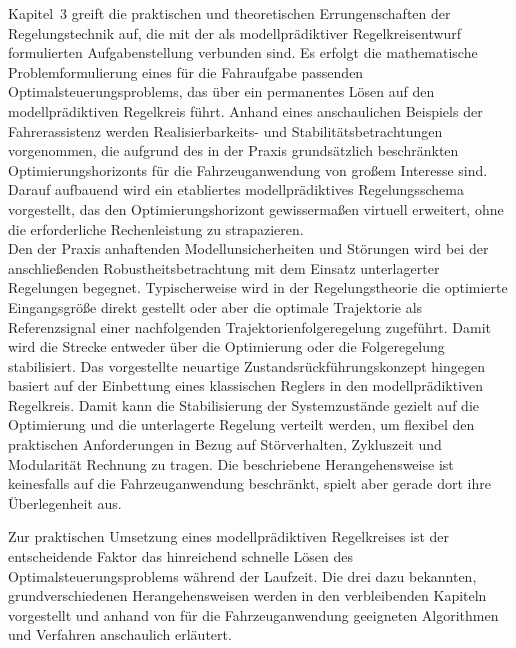 Kapitel~3 greift die praktischen und theoretischen Errungenschaften der Regelungstechnik auf, die mit der als modellprädiktiver Regelkreisentwurf formulierten Aufgabenstellung verbunden sind. Es erfolgt die mathematische Problemformulierung eines für die Fahraufgabe passenden Optimalsteuerungsproblems, das über ein permanentes Lösen auf den modellprädiktiven Regelkreis führt. 
Anhand eines anschaulichen Beispiels der Fahrerassistenz werden Realisierbarkeits- und Stabilitätsbetrachtungen vorgenommen, die aufgrund des in der Praxis grundsätzlich beschränkten Optimierungshorizonts für die Fahrzeuganwendung von großem Interesse sind.  Darauf aufbauend wird ein etabliertes modellprädiktives Regelungsschema vorgestellt, das den Optimierungshorizont gewissermaßen virtuell erweitert, ohne die erforderliche Rechenleistung zu strapazieren. \\
Den der Praxis anhaftenden Modellunsicherheiten und Störungen wird bei der anschließenden Robustheitsbetrachtung mit dem Einsatz unterlagerter Regelungen begegnet. Typischerweise wird in der Regelungstheorie die optimierte Eingangsgröße direkt gestellt oder aber die optimale Trajektorie als Referenzsignal einer nachfolgenden Trajektorienfolgeregelung zugeführt. Damit wird die Strecke entweder über die Optimierung oder die Folgeregelung stabilisiert. Das vorgestellte neuartige Zustandsrückführungskonzept hingegen basiert auf der Einbettung eines klassischen Reglers in den modellprädiktiven Regelkreis. Damit kann die Stabilisierung der Systemzustände gezielt auf die Optimierung und die unterlagerte Regelung verteilt werden, um flexibel den praktischen Anforderungen in Bezug auf Störverhalten, Zykluszeit und Modularität Rechnung zu tragen. Die beschriebene Herangehensweise ist keinesfalls auf die Fahrzeuganwendung beschränkt, spielt aber gerade dort ihre Überlegenheit aus.

Zur praktischen Umsetzung eines modellprädiktiven Regelkreises ist der entscheidende Faktor das hinreichend schnelle Lösen des Optimalsteuerungsproblems während der Laufzeit. Die drei dazu bekannten, grundverschiedenen Herangehensweisen werden in den verbleibenden Kapiteln vorgestellt und anhand von für die Fahrzeuganwendung geeigneten Algorithmen und Verfahren anschaulich erläutert.

